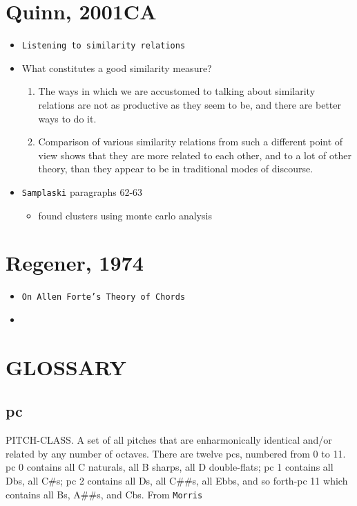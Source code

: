 \documentclass[11pt]{article}
\begin{document}
{{\section{Quinn, 2001\hfill{}\textsc{CA}}
\label{sec-19}
\begin{itemize}
\item \texttt{Listening to similarity relations}
\item What constitutes a good similarity measure?
\begin{enumerate}
\item The ways in which we are accustomed to talking about similarity
relations are not as productive as they seem to be, and there
are better ways to do it.
\item Comparison of various similarity relations from such a
different point of view shows that they are more related to
each other, and to a lot of other theory, than they appear to
be in traditional modes of discourse.
\end{enumerate}
\item \texttt{Samplaski} paragraphs 62-63
\begin{itemize}
\item found clusters using monte carlo analysis
\end{itemize}
\end{itemize}

\section{Regener, 1974}
\label{sec-20}
\begin{itemize}
\item \texttt{On Allen Forte's Theory of Chords}
\item 
\end{itemize}

\section{GLOSSARY}
\label{sec-21}
\subsection{pc}
\label{sec-21-1}
PITCH-CLASS. A set of all pitches that are enharmonically identical
and/or related by any number of octaves. There are twelve pcs,
numbered from 0 to 11. pc 0 contains all C naturals, all B sharps, all
D double-flats; pc 1 contains all Dbs, all C\#s; pc 2 contains all Ds,
all C\#\#s, all Ebbs, and so forth-pc 11 which contains all Bs, A\#\#s,
and Cbs.  From \texttt{Morris}

}}
\end{document}
